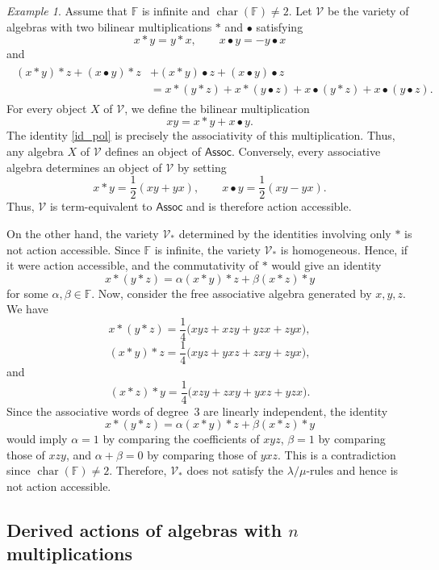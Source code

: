 \documentclass[reqno,a4paper]{amsart}
\theoremstyle{plain}
\theoremstyle{definition}
\theoremstyle{remark}
\newtheorem{example}[subsection]{Example}
\numberwithin{equation}{section}
\newcommand{\F}{\mathbb{F}}
\newcommand{\V}{\mathcal{V}}
\DeclareMathOperator{\bchar}{char}
\newcommand{\Assoc}{\ensuremath{\mathsf{Assoc}}}
\begin{document}
\begin{example}\label{ExampleAccessibleReductNotAccessible}
Assume that $\F$ is infinite and $\bchar(\F)\neq2$. Let $\V$ be the variety of algebras with two bilinear multiplications $\ast$ and $\bullet$ satisfying
\[
x\ast y=y\ast x,
\qquad
x\bullet y=-y\bullet x
\]
and
\begin{align}\label{id_pol}
\begin{split}
(x\ast y)\ast z
+(x\bullet y)\ast z
&+(x\ast y)\bullet z
+(x\bullet y)\bullet z
\\&=x\ast(y\ast z)
+x\ast(y\bullet z)
+x\bullet(y\ast z)
+x\bullet(y\bullet z).
\end{split}
\end{align}
For every object $X$ of $\V$, we define the bilinear multiplication
\[
xy=x\ast y+x\bullet y.
\]
The identity \eqref{id_pol} is precisely the associativity of this multiplication. Thus, any algebra $X$ of $\V$ defines an object of $\Assoc$. Conversely, every associative algebra determines an object of $\V$ by setting
\[
x\ast y=\frac12(xy+yx),
\qquad
x\bullet y=\frac12(xy-yx).
\]
Thus, $\V$ is term-equivalent to $\Assoc$ and is therefore action accessible.

On the other hand, the variety $\V_\ast$ determined by the identities involving only $\ast$ is not action accessible. Since $\F$ is infinite, the variety $\V_\ast$ is homogeneous. Hence, if it were action accessible,  and the commutativity of $\ast$ would give an identity
\[
x\ast(y\ast z)
=
\alpha(x\ast y)\ast z
+
\beta(x\ast z)\ast y
\]
for some $\alpha,\beta\in\F$. Now, consider the free associative algebra generated by $x,y,z$. 
We have
\[
x\ast(y\ast z)
=
\frac14\bigl(xyz+xzy+yzx+zyx\bigr),
\]
\[
(x\ast y)\ast z
=
\frac14\bigl(xyz+yxz+zxy+zyx\bigr),
\]
and
\[
(x\ast z)\ast y
=
\frac14\bigl(xzy+zxy+yxz+yzx\bigr).
\]
Since the associative words of degree~$3$ are linearly independent, the identity
\[
x\ast(y\ast z)
=
\alpha(x\ast y)\ast z
+
\beta(x\ast z)\ast y
\]
would imply $\alpha=1$ by comparing the coefficients of $xyz$, $\beta=1$ by comparing those of $xzy$, and $\alpha+\beta=0$ by comparing those of $yxz$. This is a contradiction since $\bchar(\F)\neq2$. Therefore, $\V_\ast$ does not satisfy the $\lambda/\mu$-rules and hence is not action accessible.
\end{example}

\subsection{Derived actions of algebras with $n$ multiplications}\label{SecDerivedActionsNOperations}
\end{document}
